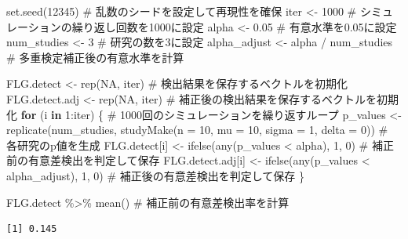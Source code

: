 \documentclass[
  a4paper,
]{ltjsbook}
\newenvironment{Shaded}{\begin{snugshade}}{\end{snugshade}}
\newcommand{\AttributeTok}[1]{\textcolor[rgb]{0.40,0.45,0.13}{#1}}
\newcommand{\CommentTok}[1]{\textcolor[rgb]{0.37,0.37,0.37}{#1}}
\newcommand{\ConstantTok}[1]{\textcolor[rgb]{0.56,0.35,0.01}{#1}}
\newcommand{\ControlFlowTok}[1]{\textcolor[rgb]{0.00,0.23,0.31}{\textbf{#1}}}
\newcommand{\DecValTok}[1]{\textcolor[rgb]{0.68,0.00,0.00}{#1}}
\newcommand{\FloatTok}[1]{\textcolor[rgb]{0.68,0.00,0.00}{#1}}
\newcommand{\FunctionTok}[1]{\textcolor[rgb]{0.28,0.35,0.67}{#1}}
\newcommand{\NormalTok}[1]{\textcolor[rgb]{0.00,0.23,0.31}{#1}}
\newcommand{\OtherTok}[1]{\textcolor[rgb]{0.00,0.23,0.31}{#1}}
\newcommand{\SpecialCharTok}[1]{\textcolor[rgb]{0.37,0.37,0.37}{#1}}
\begin{document}
\begin{Shaded}
\begin{Highlighting}[]
\FunctionTok{set.seed}\NormalTok{(}\DecValTok{12345}\NormalTok{) }\CommentTok{\# 乱数のシードを設定して再現性を確保}
\NormalTok{iter }\OtherTok{\textless{}{-}} \DecValTok{1000} \CommentTok{\# シミュレーションの繰り返し回数を1000に設定}
\NormalTok{alpha }\OtherTok{\textless{}{-}} \FloatTok{0.05} \CommentTok{\# 有意水準を0.05に設定}
\NormalTok{num\_studies }\OtherTok{\textless{}{-}} \DecValTok{3} \CommentTok{\# 研究の数を3に設定}
\NormalTok{alpha\_adjust }\OtherTok{\textless{}{-}}\NormalTok{ alpha }\SpecialCharTok{/}\NormalTok{ num\_studies }\CommentTok{\# 多重検定補正後の有意水準を計算}

\NormalTok{FLG.detect }\OtherTok{\textless{}{-}} \FunctionTok{rep}\NormalTok{(}\ConstantTok{NA}\NormalTok{, iter) }\CommentTok{\# 検出結果を保存するベクトルを初期化}
\NormalTok{FLG.detect.adj }\OtherTok{\textless{}{-}} \FunctionTok{rep}\NormalTok{(}\ConstantTok{NA}\NormalTok{, iter) }\CommentTok{\# 補正後の検出結果を保存するベクトルを初期化}
\ControlFlowTok{for}\NormalTok{ (i }\ControlFlowTok{in} \DecValTok{1}\SpecialCharTok{:}\NormalTok{iter) \{ }\CommentTok{\# 1000回のシミュレーションを繰り返すループ}
\NormalTok{  p\_values }\OtherTok{\textless{}{-}} \FunctionTok{replicate}\NormalTok{(num\_studies, }\FunctionTok{studyMake}\NormalTok{(}\AttributeTok{n =} \DecValTok{10}\NormalTok{, }\AttributeTok{mu =} \DecValTok{10}\NormalTok{, }\AttributeTok{sigma =} \DecValTok{1}\NormalTok{, }\AttributeTok{delta =} \DecValTok{0}\NormalTok{)) }\CommentTok{\# 各研究のp値を生成}
\NormalTok{  FLG.detect[i] }\OtherTok{\textless{}{-}} \FunctionTok{ifelse}\NormalTok{(}\FunctionTok{any}\NormalTok{(p\_values }\SpecialCharTok{\textless{}}\NormalTok{ alpha), }\DecValTok{1}\NormalTok{, }\DecValTok{0}\NormalTok{) }\CommentTok{\# 補正前の有意差検出を判定して保存}
\NormalTok{  FLG.detect.adj[i] }\OtherTok{\textless{}{-}} \FunctionTok{ifelse}\NormalTok{(}\FunctionTok{any}\NormalTok{(p\_values }\SpecialCharTok{\textless{}}\NormalTok{ alpha\_adjust), }\DecValTok{1}\NormalTok{, }\DecValTok{0}\NormalTok{) }\CommentTok{\# 補正後の有意差検出を判定して保存}
\NormalTok{\}}

\NormalTok{FLG.detect }\SpecialCharTok{\%\textgreater{}\%} \FunctionTok{mean}\NormalTok{() }\CommentTok{\# 補正前の有意差検出率を計算}
\end{Highlighting}
\end{Shaded}

\begin{verbatim}
[1] 0.145
\end{verbatim}
\end{document}
